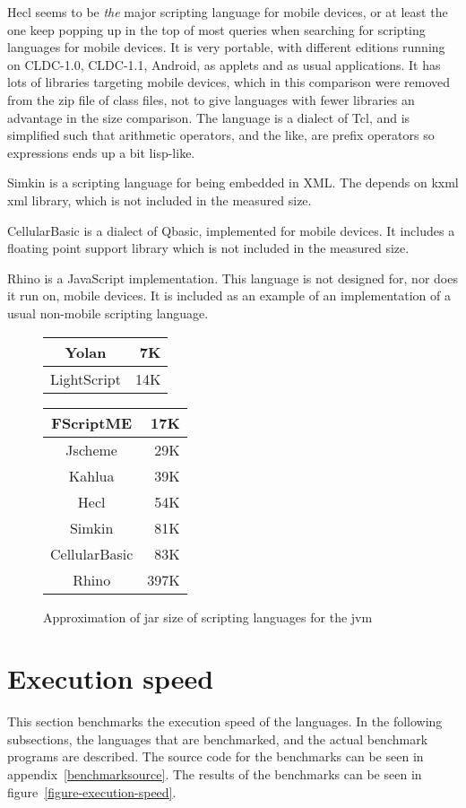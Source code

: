 Hecl\cite{hecl} seems to be \emph{the} major scripting language for mobile devices, or at least the one keep popping up in the top of most queries when searching for scripting languages for mobile devices.
It is very portable, with different editions running on CLDC-1.0, CLDC-1.1, Android, as applets and as usual applications.
It has lots of libraries targeting mobile devices, which in this comparison were removed from the zip file of class files, not to give languages with fewer libraries an advantage in the size comparison.
The language is a dialect of Tcl, and is simplified such that arithmetic operators, and the like, are prefix operators so expressions ends up a bit lisp-like.

Simkin\cite{simkin} is a scripting language for being embedded in XML. The depends on kxml xml library, which is not included in the measured size. 

CellularBasic\cite{cellularbasic} is a dialect of Qbasic, implemented for mobile devices. 
It includes a floating point support library which is not included in the measured size. 

Rhino\cite{rhino} is a JavaScript implementation. This language is not designed for, nor does it run on, mobile devices. It is included as an example of an implementation of a usual non-mobile scripting language.

\begin{figure} \begin{center}
\begin{tabular}{|c|r|} \hline 
Yolan & 7K \\ \hline 
LightScript & 14K \\ \hline 
\end{tabular}
\begin{tabular}{|c|r|} \hline 
FScriptME & 17K \\ \hline 
Jscheme & 29K \\ \hline 
Kahlua & 39K \\ \hline 
Hecl & 54K \\ \hline 
Simkin & 81K \\ \hline 
CellularBasic & 83K \\ \hline 
Rhino & 397K \\ \hline 
\end{tabular}
\end{center}
\caption{Approximation of jar size of scripting languages for the jvm}
\end{figure}

\section{Execution speed}
This section benchmarks the execution speed of the languages. 
In the following subsections, the languages that are benchmarked, and the actual benchmark programs are described.
The source code for the benchmarks can be seen in appendix~\ref{benchmarksource}.
The results of the benchmarks can be seen in figure~\ref{figure-execution-speed}.

